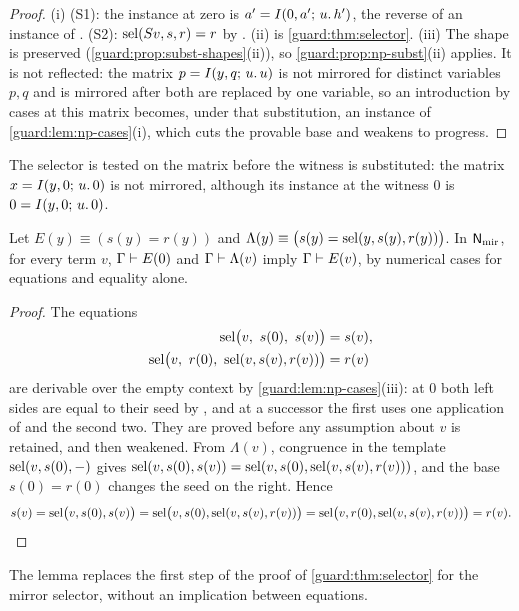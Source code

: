 \begin{proof}
(i) (S1): the instance at zero is $a'=I(0,a';\,u.\,h')$, the reverse of an
instance of .  (S2): $\operatorname{sel}(S v,s,r)=r$ by .
(ii) is \cref{guard:thm:selector}.  (iii) The shape is preserved
(\cref{guard:prop:subst-shapes}(ii)), so \cref{guard:prop:np-subst}(ii)
applies.  It is not reflected: the matrix $p=I(y,q;\,u.\,u)$ is not
mirrored for distinct variables $p,q$ and is mirrored after both are
replaced by one variable, so an introduction by cases at this matrix
becomes, under that substitution, an instance of
\cref{guard:lem:np-cases}(i), which cuts the provable base and weakens to
progress.
\end{proof}

The selector is tested on the matrix before the witness is substituted: the
matrix $x=I(y,0;\,u.\,0)$ is not mirrored, although its instance at the
witness $0$ is $0=I(y,0;\,u.\,0)$.

\begin{lemma}
\label{guard:lem:decoder}
Let $E(y)\equiv(s(y)=r(y))$ and $\Lambda(y)\equiv
\bigl(s(y)=\operatorname{sel}(y,s(y),r(y))\bigr)$.  In $\mathsf{N}_{\mathrm{mir}}$, for every
term $v$, $\Gamma\vdash E(0)$ and $\Gamma\vdash\Lambda(v)$ imply
$\Gamma\vdash E(v)$, by numerical cases for equations and equality alone.
\end{lemma}

\begin{proof}
The equations
\begin{align*}
 \operatorname{sel}\bigl(v,\ s(0),\ s(v)\bigr)&=s(v),\\
 \operatorname{sel}\bigl(v,\ r(0),\ \operatorname{sel}(v,s(v),r(v))\bigr)&=r(v)
\end{align*}
are derivable over the empty context by \cref{guard:lem:np-cases}(iii): at
$0$ both left sides are equal to their seed by , and at a
successor the first uses one application of  and the second
two.  They are proved before any assumption about $v$ is retained, and then
weakened.  From $\Lambda(v)$, congruence in the template $\operatorname{sel}(v,s(0),-)$
gives $\operatorname{sel}(v,s(0),s(v))=\operatorname{sel}(v,s(0),\operatorname{sel}(v,s(v),r(v)))$, and the base
$s(0)=r(0)$ changes the seed on the right.  Hence
\[
 s(v)=\operatorname{sel}\bigl(v,s(0),s(v)\bigr)
 =\operatorname{sel}\bigl(v,s(0),\operatorname{sel}(v,s(v),r(v))\bigr)
 =\operatorname{sel}\bigl(v,r(0),\operatorname{sel}(v,s(v),r(v))\bigr)=r(v).
\]
\end{proof}

The lemma replaces the first step of the proof of
\cref{guard:thm:selector} for the mirror selector, without an implication
between equations.

